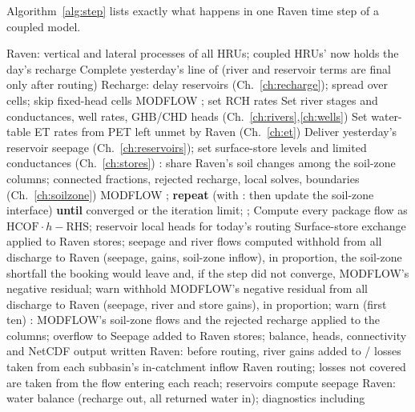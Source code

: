 Algorithm~\ref{alg:step} lists exactly what happens in one Raven time step of a coupled model.

\begin{algorithm}[h]\caption{One coupled time step}\label{alg:step}
\begin{algorithmic}[1]
\State Raven: vertical and lateral processes of all HRUs; coupled HRUs'  now holds the day's recharge
\State Complete yesterday's line of  (river and reservoir terms are final only after routing)
\State Recharge: delay reservoirs (Ch.~\ref{ch:recharge}); spread over cells; skip fixed-head cells
\State MODFLOW ; set RCH rates
\State Set river stages and conductances, well rates, GHB/CHD heads (Ch.~\ref{ch:rivers},\ref{ch:wells})
\State Set water-table ET rates from PET left unmet by Raven (Ch.~\ref{ch:et})
\State Deliver yesterday's reservoir seepage (Ch.~\ref{ch:reservoirs}); set surface-store levels and limited conductances (Ch.~\ref{ch:stores})
\State {}: share Raven's soil changes among the soil-zone columns; connected fractions, rejected recharge, local solves,  boundaries (Ch.~\ref{ch:soilzone})
\State MODFLOW ; \textbf{repeat}  (with : then update the soil-zone interface) \textbf{until} converged or the iteration limit; ; 
\State Compute every package flow as $\mathrm{HCOF}\cdot h-\mathrm{RHS}$; reservoir local heads for today's routing
\State Surface-store exchange applied to Raven stores; seepage and river flows computed
 withhold from all discharge to Raven (seepage, gains, soil-zone inflow), in proportion, the soil-zone shortfall the booking would leave and, if the step did not converge, MODFLOW's negative residual; warn
 withhold MODFLOW's negative residual from all discharge to Raven (seepage, river and store gains), in proportion; warn (first ten) \EndIf
\State {}: MODFLOW's soil-zone flows and the rejected recharge applied to the columns; overflow to 
\State Seepage added to Raven stores; balance, heads, connectivity and NetCDF output written
\State Raven: before routing, river gains added to / losses taken from each subbasin's in-catchment inflow
\State Raven routing; losses not covered are taken from the flow entering each reach; reservoirs compute seepage
\State Raven: water balance (recharge out, all returned water in); diagnostics including 
\end{algorithmic}
\end{algorithm}

